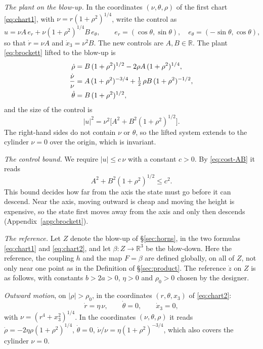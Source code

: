 \documentclass[11pt,reqno]{amsart}
\theoremstyle{plain}
\theoremstyle{definition}
\theoremstyle{remark}
\newcommand{\R}{\mathbb{R}}
\begin{document}
\emph{The plant on the blow-up.} In the coordinates $(\nu,\theta,\rho)$ of the first chart
\eqref{eq:chart1}, with $\nu=r(1+\rho^{2})^{1/4}$, write the control as
\begin{equation}\label{eq:ABframe}
  u=\nu A\,e_r+\nu(1+\rho^{2})^{1/4}B\,e_\theta,\qquad
  e_r=(\cos\theta,\sin\theta),\quad e_\theta=(-\sin\theta,\cos\theta),
\end{equation}
so that $\dot r=\nu A$ and $\dot x_3=\nu^{2}B$. The new controls are $A,B\in\R$. The plant
\eqref{eq:brockett} lifted to the blow-up is
\begin{align}
  \dot\rho&=B\,(1+\rho^{2})^{1/2}-2\rho A\,(1+\rho^{2})^{1/4}, \label{eq:shape-AB}\\
  \frac{\dot\nu}{\nu}&=A\,(1+\rho^{2})^{-3/4}+\tfrac12\,\rho B\,(1+\rho^{2})^{-1/2},
    \label{eq:size-AB}\\
  \dot\theta&=B\,(1+\rho^{2})^{1/2},\notag
\end{align}
and the size of the control is
\begin{equation}\label{eq:cost-AB}
  |u|^{2}=\nu^{2}\bigl[A^{2}+B^{2}(1+\rho^{2})^{1/2}\bigr].
\end{equation}
The right-hand sides do not contain $\nu$ or $\theta$, so the lifted system extends to the
cylinder $\nu=0$ over the origin, which is invariant.

\emph{The control bound.} We require $|u|\le c\,\nu$ with a constant $c>0$. By \eqref{eq:cost-AB} it reads
\begin{equation}\label{eq:bound-AB}
  A^{2}+B^{2}(1+\rho^{2})^{1/2}\le c^{2}.
\end{equation}
This bound decides how far from the axis the state must go before it can descend.
Near the axis, moving outward is cheap and moving the height is expensive, so the state first moves
away from the axis and only then descends (Appendix~\ref{app:brockett}).

\emph{The reference.} Let $Z$ denote the blow-up of \S\ref{sec:horns}, in the two
formulas \eqref{eq:chart1} and \eqref{eq:chart2}, and let $\beta\colon Z\to\R^{3}$ be the
blow-down. Here the reference, the coupling $h$ and the map $F=\beta$ are defined globally, on all of $Z$,
not only near one point as in the Definition of \S\ref{sec:product}. The reference $\dot z$ on $Z$ is as follows, with constants
$b>2a>0$, $\eta>0$ and $\rho_0>0$ chosen by the designer.

\emph{Outward motion}, on $|\rho|>\rho_0$, in the coordinates $(r,\theta,x_3)$ of \eqref{eq:chart2}:
\begin{equation}\label{eq:entry}
  \dot r=\eta\,\nu,\qquad \dot\theta=0,\qquad \dot x_3=0,
\end{equation}
with $\nu=(r^{4}+x_3^{2})^{1/4}$. In the coordinates $(\nu,\theta,\rho)$ it reads
$\dot\rho=-2\eta\rho(1+\rho^{2})^{1/4}$, $\dot\theta=0$, $\dot\nu/\nu=\eta(1+\rho^{2})^{-3/4}$, which
also covers the cylinder $\nu=0$.
\end{document}
